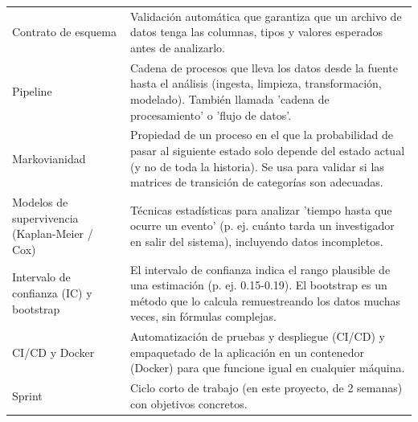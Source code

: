 \begin{longtable}{>{\raggedright\arraybackslash}p{4.3cm}>{\raggedright\arraybackslash}p{9.8cm}}
 \\
    Contrato de esquema & Validación automática que garantiza que un archivo de datos tenga las columnas, tipos y valores esperados antes de analizarlo.
 \\
    Pipeline & Cadena de procesos que lleva los datos desde la fuente hasta el análisis (ingesta, limpieza, transformación, modelado). También llamada 'cadena de procesamiento' o 'flujo de datos'.
 \\
    Markovianidad & Propiedad de un proceso en el que la probabilidad de pasar al siguiente estado solo depende del estado actual (y no de toda la historia). Se usa para validar si las matrices de transición de categorías son adecuadas.
 \\
    Modelos de supervivencia (Kaplan-Meier / Cox) & Técnicas estadísticas para analizar 'tiempo hasta que ocurre un evento' (p. ej. cuánto tarda un investigador en salir del sistema), incluyendo datos incompletos.
 \\
    Intervalo de confianza (IC) y bootstrap & El intervalo de confianza indica el rango plausible de una estimación (p. ej. 0.15-0.19). El bootstrap es un método que lo calcula remuestreando los datos muchas veces, sin fórmulas complejas.
 \\
    CI/CD y Docker & Automatización de pruebas y despliegue (CI/CD) y empaquetado de la aplicación en un contenedor (Docker) para que funcione igual en cualquier máquina.
 \\
    Sprint & Ciclo corto de trabajo (en este proyecto, de 2 semanas) con objetivos concretos.
 \\
\bottomrule
\end{longtable}
\endgroup
